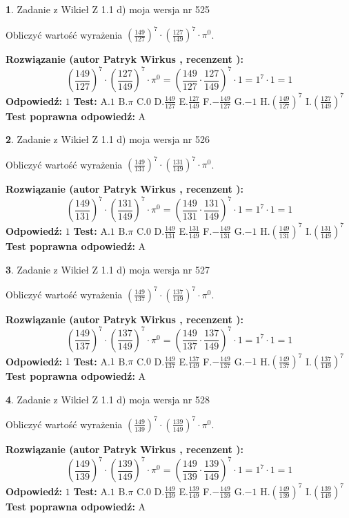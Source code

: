 \documentclass[12pt, a4paper]{article}
\theoremstyle{definition} %
\newtheorem{zad}{}
\newcommand{\zadStart}[1]{\begin{zad}#1\newline}
\newcommand{\zadStop}{\end{zad}}
\newcommand{\rozwStart}[2]{\noindent \textbf{Rozwiązanie (autor #1 , recenzent #2): }\newline}
\newcommand{\rozwStop}{\newline}
\newcommand{\odpStart}{\noindent \textbf{Odpowiedź:}\newline}
\newcommand{\odpStop}{\newline}
\newcommand{\testStart}{\noindent \textbf{Test:}\newline}
\newcommand{\testStop}{\newline}
\newcommand{\kluczStart}{\noindent \textbf{Test poprawna odpowiedź:}\newline}
\newcommand{\kluczStop}{\newline}
\begin{document}
\zadStart{Zadanie z Wikieł Z 1.1 d) moja wersja nr 525}

Obliczyć wartość wyrażenia $(\frac{149}{127})^{7} \cdot (\frac{127}{149})^{7} \cdot \pi^{0}$.
\zadStop
\rozwStart{Patryk Wirkus}{}
$$(\frac{149}{127})^{7} \cdot (\frac{127}{149})^{7} \cdot \pi^{0} = (\frac{149}{127} \cdot \frac{127}{149})^{7} \cdot 1 = 1^{7} \cdot 1 = 1$$
\rozwStop
\odpStart
$1$
\odpStop
\testStart
A.$1$ B.$\pi$ C.$0$ D.$\frac{149}{127}$ E.$\frac{127}{149}$
F.$-\frac{149}{127}$ G.$-1$
H.$(\frac{149}{127})^{7}$
I.$(\frac{127}{149})^{7}$
\testStop
\kluczStart
A
\kluczStop



\zadStart{Zadanie z Wikieł Z 1.1 d) moja wersja nr 526}

Obliczyć wartość wyrażenia $(\frac{149}{131})^{7} \cdot (\frac{131}{149})^{7} \cdot \pi^{0}$.
\zadStop
\rozwStart{Patryk Wirkus}{}
$$(\frac{149}{131})^{7} \cdot (\frac{131}{149})^{7} \cdot \pi^{0} = (\frac{149}{131} \cdot \frac{131}{149})^{7} \cdot 1 = 1^{7} \cdot 1 = 1$$
\rozwStop
\odpStart
$1$
\odpStop
\testStart
A.$1$ B.$\pi$ C.$0$ D.$\frac{149}{131}$ E.$\frac{131}{149}$
F.$-\frac{149}{131}$ G.$-1$
H.$(\frac{149}{131})^{7}$
I.$(\frac{131}{149})^{7}$
\testStop
\kluczStart
A
\kluczStop



\zadStart{Zadanie z Wikieł Z 1.1 d) moja wersja nr 527}

Obliczyć wartość wyrażenia $(\frac{149}{137})^{7} \cdot (\frac{137}{149})^{7} \cdot \pi^{0}$.
\zadStop
\rozwStart{Patryk Wirkus}{}
$$(\frac{149}{137})^{7} \cdot (\frac{137}{149})^{7} \cdot \pi^{0} = (\frac{149}{137} \cdot \frac{137}{149})^{7} \cdot 1 = 1^{7} \cdot 1 = 1$$
\rozwStop
\odpStart
$1$
\odpStop
\testStart
A.$1$ B.$\pi$ C.$0$ D.$\frac{149}{137}$ E.$\frac{137}{149}$
F.$-\frac{149}{137}$ G.$-1$
H.$(\frac{149}{137})^{7}$
I.$(\frac{137}{149})^{7}$
\testStop
\kluczStart
A
\kluczStop



\zadStart{Zadanie z Wikieł Z 1.1 d) moja wersja nr 528}

Obliczyć wartość wyrażenia $(\frac{149}{139})^{7} \cdot (\frac{139}{149})^{7} \cdot \pi^{0}$.
\zadStop
\rozwStart{Patryk Wirkus}{}
$$(\frac{149}{139})^{7} \cdot (\frac{139}{149})^{7} \cdot \pi^{0} = (\frac{149}{139} \cdot \frac{139}{149})^{7} \cdot 1 = 1^{7} \cdot 1 = 1$$
\rozwStop
\odpStart
$1$
\odpStop
\testStart
A.$1$ B.$\pi$ C.$0$ D.$\frac{149}{139}$ E.$\frac{139}{149}$
F.$-\frac{149}{139}$ G.$-1$
H.$(\frac{149}{139})^{7}$
I.$(\frac{139}{149})^{7}$
\testStop
\kluczStart
A
\kluczStop
\end{document}
